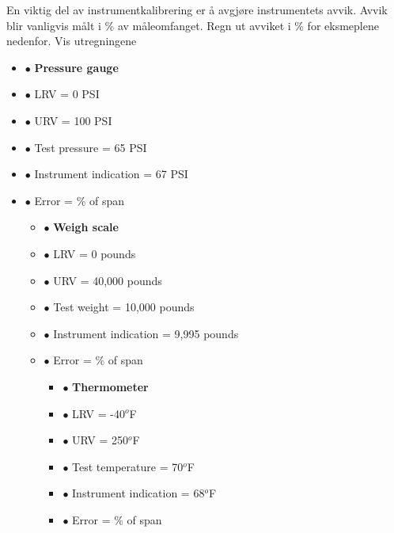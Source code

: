


En viktig del av instrumentkalibrering er å avgjøre instrumentets avvik. Avvik blir vanligvis målt i \% av måleomfanget. Regn ut avviket i \% for eksmeplene nedenfor. 
\medskip
Vis utregningene

\begin{itemize}
\item{$\bullet$} {\bf Pressure gauge}
\item{$\bullet$} LRV = 0 PSI
\item{$\bullet$} URV = 100 PSI 
\item{$\bullet$} Test pressure = 65 PSI 
\item{$\bullet$} Instrument indication = 67 PSI
\item{$\bullet$} Error = \underbar{\hskip 50pt} \% of span
\medskip

\vskip 10pt

\begin{itemize}
\item{$\bullet$} {\bf Weigh scale}
\item{$\bullet$} LRV = 0 pounds
\item{$\bullet$} URV = 40,000 pounds
\item{$\bullet$} Test weight = 10,000 pounds
\item{$\bullet$} Instrument indication = 9,995 pounds
\item{$\bullet$} Error = \underbar{\hskip 50pt} \% of span
\medskip

\vskip 10pt

\begin{itemize}
\item{$\bullet$} {\bf Thermometer}
\item{$\bullet$} LRV = -40$^{o}$F
\item{$\bullet$} URV = 250$^{o}$F
\item{$\bullet$} Test temperature = 70$^{o}$F
\item{$\bullet$} Instrument indication = 68$^{o}$F
\item{$\bullet$} Error = \underbar{\hskip 50pt} \% of span
\medskip


\end{itemize}
\end{itemize}
\end{itemize}
